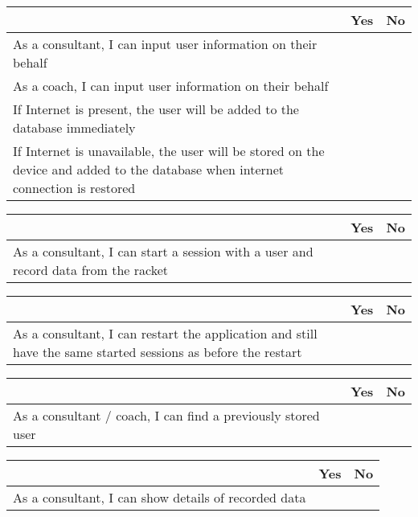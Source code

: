 \begin{tabularx}{\textwidth}{|b|c|c|}
	\hline
	 & Yes & No \\
	\hline
	As a consultant, I can input user information on their behalf & \xmark  &  \\
	\hline
	As a coach, I can input user information on their behalf & \xmark  &  \\
	\hline
	If Internet is present, the user will be added to the database immediately & \xmark & \\
	\hline
	If Internet is unavailable, the user will be stored on the device and added to the database when internet connection is restored &  & \xmark  \\
	\hline
\end{tabularx}


\begin{tabularx}{\textwidth}{|b|c|c|}
	\hline    
	 & Yes & No \\
	\hline
	As a consultant, I can start a session with a user and record data from the racket &   & \xmark  \\
	\hline
\end{tabularx}


\begin{tabularx}{\textwidth}{|b|c|c|}
	\hline
	 & Yes & No \\
	\hline
	As a consultant, I can restart the application and still have the same started sessions as before the restart &   & \xmark  \\
	\hline
\end{tabularx}


\begin{tabularx}{\textwidth}{|b|c|c|}
	\hline
	 & Yes & No \\
	\hline
	As a consultant / coach, I can find a previously stored user & \xmark  &  \\
	\hline
\end{tabularx}


\begin{tabularx}{\textwidth}{|b|c|c|}
	\hline
	 & Yes & No \\
	\hline
	As a consultant, I can show details of recorded data &   & \xmark  \\
	\hline
\end{tabularx}

